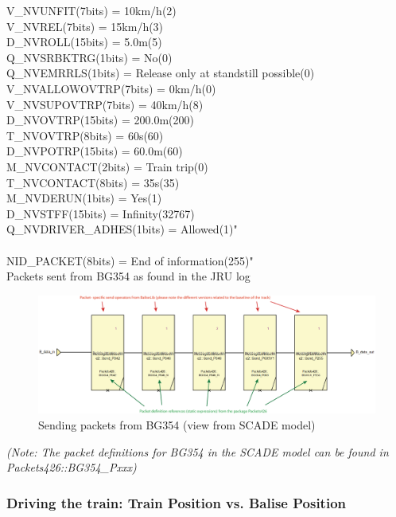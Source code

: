 \documentclass{template/openetcs_article}
\begin{document}
\begin{table}[H]
V\_NVUNFIT(7bits) = 10km/h(2) \\
V\_NVREL(7bits) = 15km/h(3) \\
D\_NVROLL(15bits) = 5.0m(5) \\
Q\_NVSRBKTRG(1bits) = No(0) \\
Q\_NVEMRRLS(1bits) = Release only at standstill possible(0) \\
V\_NVALLOWOVTRP(7bits) = 0km/h(0) \\
V\_NVSUPOVTRP(7bits) = 40km/h(8) \\
D\_NVOVTRP(15bits) = 200.0m(200) \\
T\_NVOVTRP(8bits) = 60s(60) \\
D\_NVPOTRP(15bits) = 60.0m(60) \\
M\_NVCONTACT(2bits) = Train trip(0) \\
T\_NVCONTACT(8bits) = 35s(35) \\
M\_NVDERUN(1bits) = Yes(1) \\
D\_NVSTFF(15bits) = Infinity(32767) \\
Q\_NVDRIVER\_ADHES(1bits) = Allowed(1)" \\
\\
NID\_PACKET(8bits) = End of information(255)" \\
\caption{Packets sent from BG354 as found in the JRU log}
  \label{tab:pbg354}
\end{table}

\begin{figure}[H]
  \centering
  \includegraphics[width=6.5in]{images/PacketsBG354.eps}
  \caption{Sending packets from BG354 (view from SCADE model)}
  \label{fig:packets354SCADE}
\end{figure}

\emph{(Note: The packet definitions for BG354 in the SCADE model can be found in Packets426::BG354\_Pxxx)}

\subsubsection{Driving the train: Train Position vs. Balise Position}
\end{document}
